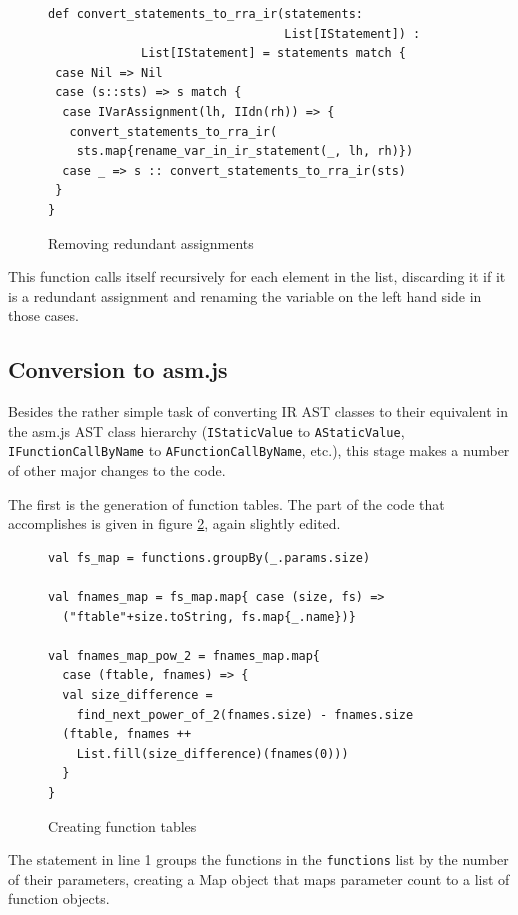 \documentclass[11pt]{report}
\begin{document}
\begin{figure}[ht]
\begin{lstlisting}
def convert_statements_to_rra_ir(statements: 
                                 List[IStatement]) : 
             List[IStatement] = statements match {
 case Nil => Nil
 case (s::sts) => s match {
  case IVarAssignment(lh, IIdn(rh)) => {
   convert_statements_to_rra_ir(
    sts.map{rename_var_in_ir_statement(_, lh, rh)})
  case _ => s :: convert_statements_to_rra_ir(sts)
 }
}
\end{lstlisting}
\caption{Removing redundant assignments}
\label{remredasign1}
\end{figure}

This function calls itself recursively for each element in the list, discarding it if it is a redundant assignment and renaming the variable on the left hand side in those cases.

\subsection{Conversion to asm.js}
Besides the rather simple task of converting IR AST classes to their equivalent in the asm.js AST class hierarchy (\texttt{IStaticValue} to \texttt{AStaticValue}, \texttt{IFunctionCallByName} to \texttt{AFunctionCallByName}, etc.), this stage makes a number of other major changes to the code.

The first is the generation of function tables. The part of the code that accomplishes is given in figure \ref{iconvasmjs1}, again slightly edited.

\begin{figure}[ht]
\begin{lstlisting}
val fs_map = functions.groupBy(_.params.size)

val fnames_map = fs_map.map{ case (size, fs) => 
  ("ftable"+size.toString, fs.map{_.name})}
  
val fnames_map_pow_2 = fnames_map.map{ 
  case (ftable, fnames) => {
  val size_difference = 
    find_next_power_of_2(fnames.size) - fnames.size
  (ftable, fnames ++ 
    List.fill(size_difference)(fnames(0)))
  }
}
\end{lstlisting}
\caption{Creating function tables}
\label{iconvasmjs1}
\end{figure}

The statement in line 1 groups the functions in the \texttt{functions} list by the number of their parameters, creating a Map object that maps parameter count to a list of function objects.
\end{document}
